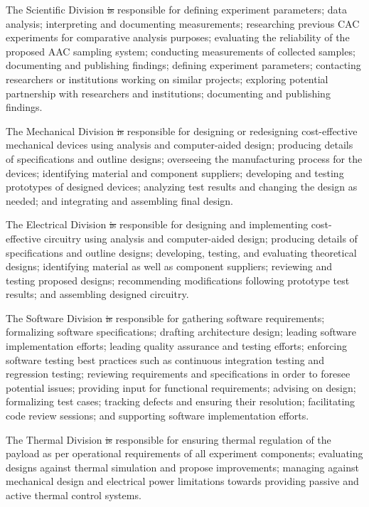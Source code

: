\documentclass[a4paper,12pt,oneside]{article}
\providecommand{\DIFaddtex}[1]{{\protect\color{blue}\uwave{#1}}} %
\providecommand{\DIFdeltex}[1]{{\protect\color{red}\sout{#1}}}                      %
\providecommand{\DIFaddbegin}{} %
\providecommand{\DIFaddend}{} %
\providecommand{\DIFdelbegin}{} %
\providecommand{\DIFdelend}{} %
\providecommand{\DIFadd}[1]{\texorpdfstring{\DIFaddtex{#1}}{#1}} %
\providecommand{\DIFdel}[1]{\texorpdfstring{\DIFdeltex{#1}}{}} %
\newcommand{\DIFscaledelfig}{0.5}
\newlength{\DIFdelgraphicswidth} %
\newlength{\DIFdelgraphicsheight} %
\newcommand{\DIFaddincludegraphics}[2][]{{\color{blue}\fbox{\DIFOincludegraphics[#1]{#2}}}} %
\newcommand{\DIFdelincludegraphics}[2][]{%
\sbox{\DIFdelgraphicsbox}{\DIFOincludegraphics[#1]{#2}}%
\settoboxwidth{\DIFdelgraphicswidth}{\DIFdelgraphicsbox} %
\settoboxtotalheight{\DIFdelgraphicsheight}{\DIFdelgraphicsbox} %
\scalebox{\DIFscaledelfig}{%
\parbox[b]{\DIFdelgraphicswidth}{\usebox{\DIFdelgraphicsbox}\\[-\baselineskip] \rule{\DIFdelgraphicswidth}{0em}}\llap{\resizebox{\DIFdelgraphicswidth}{\DIFdelgraphicsheight}{%
\setlength{\unitlength}{\DIFdelgraphicswidth}%
\begin{picture}(1,1)%
\thicklines\linethickness{2pt} %
{\color[rgb]{1,0,0}\put(0,0){\framebox(1,1){}}}%
{\color[rgb]{1,0,0}\put(0,0){\line( 1,1){1}}}%
{\color[rgb]{1,0,0}\put(0,1){\line(1,-1){1}}}%
\end{picture}%
}\hspace*{3pt}}} %
} %
\DeclareRobustCommand{\DIFaddbegin}{\DIFOaddbegin \let\includegraphics\DIFaddincludegraphics} %
\DeclareRobustCommand{\DIFaddend}{\DIFOaddend \let\includegraphics\DIFOincludegraphics} %
\DeclareRobustCommand{\DIFdelbegin}{\DIFOdelbegin \let\includegraphics\DIFdelincludegraphics} %
\DeclareRobustCommand{\DIFdelend}{\DIFOaddend \let\includegraphics\DIFOincludegraphics} %
\begin{document}
The Scientific Division \DIFdelbegin \DIFdel{is }\DIFdelend \DIFaddbegin \DIFadd{was }\DIFaddend responsible for defining experiment parameters; data analysis; interpreting and documenting measurements; researching previous CAC experiments for comparative analysis purposes; evaluating the reliability of the proposed AAC sampling system; conducting measurements of collected samples; documenting and publishing findings; defining experiment parameters; contacting researchers or institutions working on similar projects; exploring potential partnership with researchers and institutions; documenting and publishing findings.

The Mechanical Division \DIFdelbegin \DIFdel{is }\DIFdelend \DIFaddbegin \DIFadd{was }\DIFaddend responsible for designing or redesigning cost-effective mechanical devices using analysis and computer-aided design; producing details of specifications and outline designs; overseeing the manufacturing process for the devices; identifying material and component suppliers; developing and testing prototypes of designed devices; analyzing test results and changing the design as needed; and integrating and assembling final design.

The Electrical Division \DIFdelbegin \DIFdel{is }\DIFdelend \DIFaddbegin \DIFadd{was }\DIFaddend responsible for designing and implementing cost-effective circuitry using analysis and computer-aided design; producing details of specifications and outline designs; developing, testing, and evaluating theoretical designs; identifying material as well as component suppliers; reviewing and testing proposed designs; recommending modifications following prototype test results; and assembling designed circuitry.

The Software Division \DIFdelbegin \DIFdel{is }\DIFdelend \DIFaddbegin \DIFadd{was }\DIFaddend responsible for gathering software requirements; formalizing software specifications; drafting architecture design; leading software implementation efforts; leading quality assurance and testing efforts; enforcing software testing best practices such as continuous integration testing and regression testing; reviewing requirements and specifications in order to foresee potential issues; providing input for functional requirements; advising on design; formalizing test cases; tracking defects and ensuring their resolution; facilitating code review sessions; and supporting software implementation efforts.

The Thermal Division \DIFdelbegin \DIFdel{is }\DIFdelend \DIFaddbegin \DIFadd{was }\DIFaddend responsible for ensuring thermal regulation of the payload as per operational requirements of all experiment components; evaluating designs against thermal simulation and propose improvements; managing against mechanical design and electrical power limitations towards providing passive and active thermal control systems.
\end{document}
